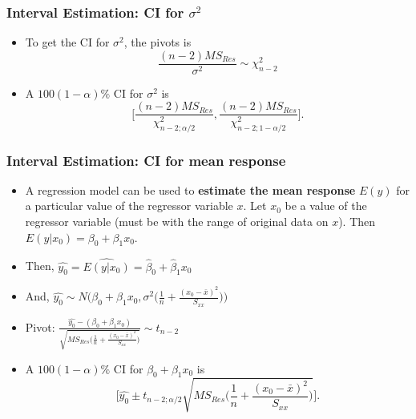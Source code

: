 \documentclass[10pt]{beamer} %
\begin{document}
\begin{frame}
	\frametitle{Interval Estimation: CI for $\sigma^2$}
\begin{itemize}
\item To get the CI for $\sigma^2$, the pivots is
$$\frac{(n-2) MS_{Res}}{\sigma^2} \sim \chi_{n-2}^2$$
	\vspace{0.2cm}

\item A $100(1-\alpha)\%$ CI for $\sigma^2$ is
$$\Bigg[\frac{(n-2) MS_{Res}}{\chi_{n-2; \alpha/2}^2}, \frac{(n-2) MS_{Res}}{\chi_{n-2; 1 - \alpha/2}^2} \Bigg]. $$
\end{itemize}	
	
\end{frame}


\begin{frame}
	\frametitle{Interval Estimation: CI for mean response}
\begin{itemize}
\item A regression model can be used to \textbf{estimate the mean response} $E(y)$ for a particular value of the regressor variable $x$. Let $x_0$ be a value of the regressor variable (must be with the range of original data on $x$). Then $E(y|x_0) = \beta_0 + \beta_1 x_0$.
	\vspace{0.2cm}

\item Then, $\widehat{y_0} = \widehat{E(y|x_0)} = \hat\beta_0 + \hat\beta_1 x_0$

	\vspace{0.2cm}

\item And, $\widehat{y_0}  \sim N\Big(\beta_0 + \beta_1 x_0, \sigma^2\Big(\frac{1}{n} + \frac{(x_0 -\bar{x})^2}{S_{xx}}\Big)\Big) $

	\vspace{0.2cm}

\item Pivot: $\frac{\widehat{y_0} - (\beta_0 + \beta_1 x_0)}{\sqrt{MS_{Res}\Big(\frac{1}{n} + \frac{(x_0 -\bar{x})^2}{S_{xx}}\Big)}} \sim t_{n-2}$
	\vspace{0.2cm}

\item A $100(1-\alpha)\%$ CI for $\beta_0 + \beta_1 x_0$ is
$$\Bigg[\widehat{y_0} \pm t_{n-2; \alpha/2} \sqrt{MS_{Res}\Big(\frac{1}{n} + \frac{(x_0 -\bar{x})^2}{S_{xx}}\Big)} \Bigg].$$
\end{itemize}	
	
\end{frame}
\end{document}
